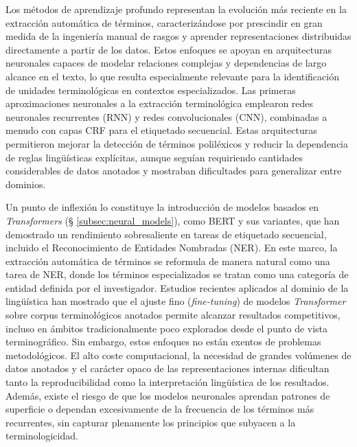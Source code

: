 Los métodos de aprendizaje profundo representan la evolución más reciente en la extracción automática de términos, caracterizándose por prescindir en gran medida de la ingeniería manual de rasgos y aprender representaciones distribuidas directamente a partir de los datos. Estos enfoques se apoyan en arquitecturas neuronales capaces de modelar relaciones complejas y dependencias de largo alcance en el texto, lo que resulta especialmente relevante para la identificación de unidades terminológicas en contextos especializados. Las primeras aproximaciones neuronales a la extracción terminológica emplearon redes neuronales recurrentes (RNN) y redes convolucionales (CNN), combinadas a menudo con capas CRF para el etiquetado secuencial. Estas arquitecturas permitieron mejorar la detección de términos poliléxicos y reducir la dependencia de reglas lingüísticas explícitas, aunque seguían requiriendo cantidades considerables de datos anotados y mostraban dificultades para generalizar entre dominios.

Un punto de inflexión lo constituye la introducción de modelos basados en \textit{Transformers} (§ \ref{subsec:neural_models}), como BERT y sus variantes, que han demostrado un rendimiento sobresaliente en tareas de etiquetado secuencial, incluido el Reconocimiento de Entidades Nombradas (NER). En este marco, la extracción automática de términos se reformula de manera natural como una tarea de NER, donde los términos especializados se tratan como una categoría de entidad definida por el investigador. Estudios recientes aplicados al dominio de la lingüística han mostrado que el ajuste fino (\textit{fine-tuning}) de modelos \textit{Transformer} sobre corpus terminológicos anotados permite alcanzar resultados competitivos, incluso en ámbitos tradicionalmente poco explorados desde el punto de vista terminográfico. Sin embargo, estos enfoques no están exentos de problemas metodológicos. El alto coste computacional, la necesidad de grandes volúmenes de datos anotados y el carácter opaco de las representaciones internas dificultan tanto la reproducibilidad como la interpretación lingüística de los resultados. Además, existe el riesgo de que los modelos neuronales aprendan patrones de superficie o dependan excesivamente de la frecuencia de los términos más recurrentes, sin capturar plenamente los principios que subyacen a la terminologicidad.

